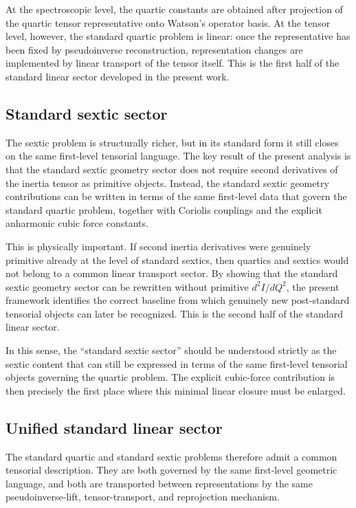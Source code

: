 At the spectroscopic level, the quartic constants are obtained after
projection of the quartic tensor representative onto Watson's operator
basis. At the tensor level, however, the standard quartic problem is
linear: once the representative has been fixed by pseudoinverse
reconstruction, representation changes are implemented by linear
transport of the tensor itself. This is the first half of the
standard linear sector developed in the present work.

\subsection{Standard sextic sector}

The sextic problem is structurally richer, but in its standard form it
still closes on the same first-level tensorial language. The key
result of the present analysis is that the standard sextic geometry
sector does not require second derivatives of the inertia tensor as
primitive objects. Instead, the standard sextic geometry contributions
can be written in terms of the same first-level data that govern the
standard quartic problem, together with Coriolis couplings and the
explicit anharmonic cubic force constants.

This is physically important. If second inertia derivatives were
genuinely primitive already at the level of standard sextics, then
quartics and sextics would not belong to a common linear transport
sector. By showing that the standard sextic geometry sector can be
rewritten without primitive $d^2I/dQ^2$, the present framework
identifies the correct baseline from which genuinely new
post-standard tensorial objects can later be recognized. This is the
second half of the standard linear sector.

In this sense, the ``standard sextic sector'' should be understood
strictly as the sextic content that can still be expressed in terms of
the same first-level tensorial objects governing the quartic problem.
The explicit cubic-force contribution is then precisely the first place
where this minimal linear closure must be enlarged.

\subsection{Unified standard linear sector}

The standard quartic and standard sextic problems therefore admit a
common tensorial description. They are both governed by the same
first-level geometric language, and both are transported between
representations by the same pseudoinverse-lift, tensor-transport, and
reprojection mechanism.

